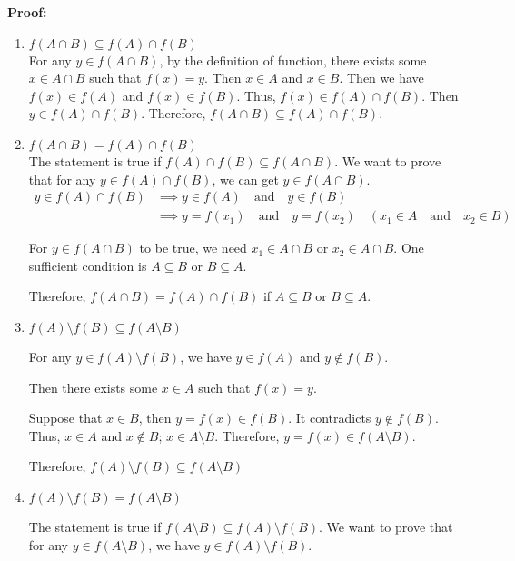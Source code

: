 \documentclass[12pt]{article}
\newcommand{\fasb}{
f(A) \cap f(B)
}
\newcommand{\fab}{
f(A \cap B)
}
\newcommand{\fxab}{
    f(A) \setminus f(B)
}
\newcommand{\faxb}{
    f(A \setminus B)
}
\newcommand{\fxstTwo}{
\fxab \subseteq \faxb
}
\newcommand{\fxstThree}{
\fxab = \faxb
}
\newcommand{\fxstFour}{
\faxb \subseteq \fxab
}
\begin{document}
\textbf{Proof:}
\renewcommand{\labelenumi}{\alph{enumi})}
\renewcommand{\labelenumii}{\arabic{enumii})}
\begin{enumerate}
    \item \(f(A \cap B) \subseteq f(A) \cap f(B)\)\\
    For any \(y \in f(A \cap B)\), by the definition of function, there exists some \(x \in A \cap B\) such that \(f(x) = y \).
    Then \(x \in A\) and \(x \in B\). Then we have \(f(x) \in f(A)\) and \(f(x) \in f(B)\). Thus, \(f(x) \in f(A) \cap f(B)\).
    Then \(y \in f(A) \cap f(B)\). Therefore, \(f(A \cap B) \subseteq f(A) \cap f(B)\).
    \item \(\fab = \fasb \)\\
    The statement is true if \(\fasb \subseteq \fab\). We want to prove that for any \(y \in \fasb\),
    we can get \(y \in \fab\).
    \begin{equation}
        \begin{aligned}
        y \in \fasb & \implies y \in f(A) \quad \text{and} \quad y \in f(B)\\
        & \implies y = f(x_1) \quad \text{and} \quad y = f(x_2) \quad
        (x_1 \in A \quad \text{and} \quad  x_2 \in B)
        \end{aligned}
    \end{equation}

    For \(y \in \fab\) to be true, we need \(x_1 \in A \cap B\) or \(x_2 \in A \cap B\).
    One sufficient condition is \(A \subseteq B\) or \(B \subseteq A\).

    Therefore, \(\fab = \fasb\) if \(A \subseteq B\) or \(B \subseteq A\).

    \item \(\fxstTwo\)

    For any \(y \in \fxab\), we have \(y \in f(A)\) and \(y \notin f(B)\).

    Then there exists some \(x \in A\) such that \(f(x)=y\).

    Suppose that \(x \in B\), then \(y = f(x) \in f(B)\). It contradicts \(y \notin f(B)\).
    Thus, \(x \in A\) and \(x \notin B\); \(x \in A \setminus B\). Therefore, \(y = f(x) \in \faxb\).

    Therefore, \(\fxstTwo\)

    \item \(\fxstThree\)

    The statement is true if \(\fxstFour\). We want to prove that for any \(y \in \faxb\), we have
    \(y \in \fxab\).


\end{enumerate}
\end{document}
